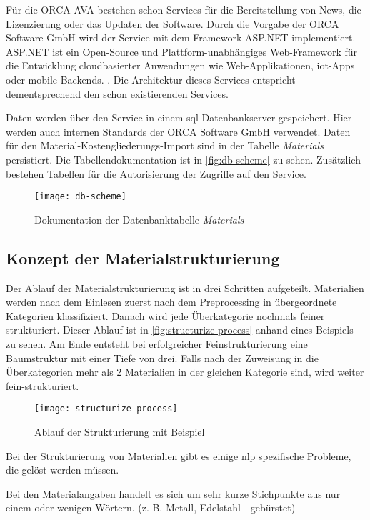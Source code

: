 Für die ORCA AVA bestehen schon Services für die Bereitstellung von News, die Lizenzierung oder das Updaten der Software. Durch die Vorgabe der ORCA Software GmbH wird der Service mit dem Framework ASP.NET implementiert. ASP.NET ist ein Open-Source und Plattform-unabhängiges Web-Framework für die Entwicklung cloudbasierter Anwendungen wie Web-Applikationen, \ac{iot}-Apps oder mobile Backends. \citep[vgl.][]{asp-net}. Die Architektur dieses Services entspricht dementsprechend den schon existierenden Services.

Daten werden über den Service in einem \ac{sql}-Datenbankserver gespeichert. Hier werden auch internen Standards der ORCA Software GmbH verwendet. Daten für den Material-Kostengliederungs-Import sind in der Tabelle \textit{Materials} persistiert. Die Tabellendokumentation ist in \autoref{fig:db-scheme} zu sehen. Zusätzlich bestehen Tabellen für die Autorisierung der Zugriffe auf den Service.

\begin{figure}[h]
	\centering
	\texttt{[image: db-scheme]}
	\caption{Dokumentation der Datenbanktabelle \textit{Materials}}
	\label{fig:db-scheme}
\end{figure}

\subsection{Konzept der Materialstrukturierung}
\label{c:conception:architecture:structuring}
Der Ablauf der Materialstrukturierung ist in drei Schritten aufgeteilt. Materialien werden nach dem Einlesen zuerst nach dem Preprocessing in übergeordnete Kategorien klassifiziert. Danach wird jede Überkategorie nochmals feiner strukturiert.
Dieser Ablauf ist in \autoref{fig:structurize-process} anhand eines Beispiels zu sehen. Am Ende entsteht bei erfolgreicher Feinstrukturierung eine Baumstruktur mit einer Tiefe von drei. Falls nach der Zuweisung in die Überkategorien mehr als 2 Materialien in der gleichen Kategorie sind, wird weiter fein-strukturiert.

\begin{figure}[h]
	\centering
	\texttt{[image: structurize-process]}
	\caption{Ablauf der Strukturierung mit Beispiel}
	\label{fig:structurize-process}
\end{figure}

Bei der Strukturierung von Materialien gibt es einige \ac{nlp} spezifische Probleme, die gelöst werden müssen. 
\begin{problem}
	\label{p:shorttext}
	Bei den Materialangaben handelt es sich um sehr kurze Stichpunkte aus nur einem oder wenigen Wörtern. (z. B. Metall, Edelstahl - gebürstet)
\end{problem}

